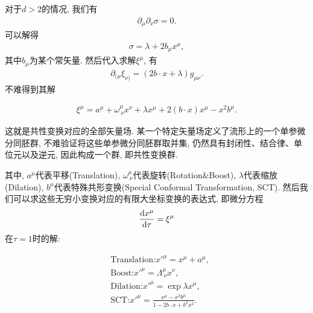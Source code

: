 对于$d>2$的情况, 我们有
\begin{align}
    \partial_\mu\partial_\nu\sigma=0.
\end{align}
可以解得
\begin{align}
    \sigma=\lambda+2b_\mu x^\mu, 
\end{align}
其中$b_\mu$为某个常矢量. 然后代入求解$\xi^\mu$, 有
\begin{align}
    \partial_{(\mu}\xi_{\nu)}=(2b\cdot x+\lambda)g_{\mu\nu}.
\end{align}
不难得到其解
\begin{theorem}[共形Killing矢量场]
    \begin{align}
        \xi^\mu=a^\mu+\omega^\mu_{~\nu}x^\nu+\lambda x^\mu+2(b\cdot x)x^\mu-x^2 b^\mu.
    \end{align}
\end{theorem}
这就是共性变换对应的全部矢量场. 某一个特定矢量场定义了流形上的一个单参微分同胚群, 不难验证将这些单参微分同胚群取并集, 仍然具有封闭性、结合律、单位元以及逆元, 因此构成一个群, 即共性变换群.

其中, $a^\mu$代表平移(Translation), $\omega^\mu_{~\nu}$代表旋转(Rotation\&Boost), $\lambda$代表缩放(Dilation), $b^\mu$代表特殊共形变换(Special Conformal Transformation, SCT). 然后我们可以求这些无穷小变换对应的有限大坐标变换的表达式, 即微分方程
\begin{align}
    \frac{\mathrm dx^\mu}{\mathrm d\tau}=\xi^\mu
\end{align}
在$\tau=1$时的解:
\begin{theorem}[有限大共形变换]
    \begin{align}
        &\text{Translation:} x'^\mu=x^\mu+a^\mu,\\
        &\text{Boost:}  x'^\mu=\Lambda^\mu_{~\nu}x^\nu,\\
        &\text{Dilation:}  x'^\mu=\exp{\lambda}x^\mu,\\
        &\text{SCT:} x'^\mu=\frac{x^\mu-x^2b^\mu}{1-2b\cdot x+b^2 x^2}\label{sct-trans}.
    \end{align}
\end{theorem}

